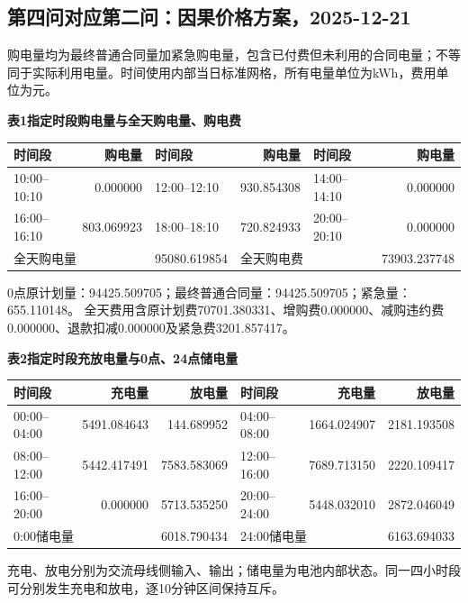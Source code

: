 \subsection{第四问对应第二问：因果价格方案，2025-12-21}
\begingroup\small
\setlength{\tabcolsep}{4pt}\renewcommand{\arraystretch}{1.08}
\setlength{\LTpre}{4pt}\setlength{\LTpost}{4pt}
\noindent 购电量均为最终普通合同量加紧急购电量，包含已付费但未利用的合同电量；不等同于实际利用电量。时间使用内部当日标准网格，所有电量单位为kWh，费用单位为元。
\begin{center}\textbf{表1\quad 指定时段购电量与全天购电量、购电费}\par\smallskip
\begin{tabular}{lr lr lr}\toprule
时间段 & 购电量 & 时间段 & 购电量 & 时间段 & 购电量\\\midrule
10:00--10:10 & 0.000000 & 12:00--12:10 & 930.854308 & 14:00--14:10 & 0.000000\\
16:00--16:10 & 803.069923 & 18:00--18:10 & 720.824933 & 20:00--20:10 & 0.000000\\
\midrule
\multicolumn{2}{l}{全天购电量} & 95080.619854 & \multicolumn{2}{l}{全天购电费} & 73903.237748\\
\bottomrule\end{tabular}\end{center}
\noindent 0点原计划量：94425.509705；最终普通合同量：94425.509705；紧急量：655.110148。
全天费用含原计划费70701.380331、增购费0.000000、减购违约费0.000000、退款扣减0.000000及紧急费3201.857417。
\begin{center}\textbf{表2\quad 指定时段充放电量与0点、24点储电量}\par\smallskip
\begin{tabular}{lrr lrr}\toprule
时间段 & 充电量 & 放电量 & 时间段 & 充电量 & 放电量\\\midrule
00:00--04:00 & 5491.084643 & 144.689952 & 04:00--08:00 & 1664.024907 & 2181.193508\\
08:00--12:00 & 5442.417491 & 7583.583069 & 12:00--16:00 & 7689.713150 & 2220.109417\\
16:00--20:00 & 0.000000 & 5713.535250 & 20:00--24:00 & 5448.032010 & 2872.046049\\
\midrule
\multicolumn{2}{l}{0:00储电量} & 6018.790434 & \multicolumn{2}{l}{24:00储电量} & 6163.694033\\
\bottomrule\end{tabular}\end{center}
\noindent 充电、放电分别为交流母线侧输入、输出；储电量为电池内部状态。同一四小时段可分别发生充电和放电，逐10分钟区间保持互斥。
